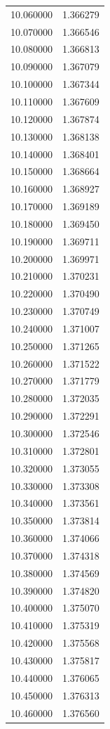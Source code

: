 \begin{tabular}{rr}
10.060000 & 1.366279 \\
10.070000 & 1.366546 \\
10.080000 & 1.366813 \\
10.090000 & 1.367079 \\
10.100000 & 1.367344 \\
10.110000 & 1.367609 \\
10.120000 & 1.367874 \\
10.130000 & 1.368138 \\
10.140000 & 1.368401 \\
10.150000 & 1.368664 \\
10.160000 & 1.368927 \\
10.170000 & 1.369189 \\
10.180000 & 1.369450 \\
10.190000 & 1.369711 \\
10.200000 & 1.369971 \\
10.210000 & 1.370231 \\
10.220000 & 1.370490 \\
10.230000 & 1.370749 \\
10.240000 & 1.371007 \\
10.250000 & 1.371265 \\
10.260000 & 1.371522 \\
10.270000 & 1.371779 \\
10.280000 & 1.372035 \\
10.290000 & 1.372291 \\
10.300000 & 1.372546 \\
10.310000 & 1.372801 \\
10.320000 & 1.373055 \\
10.330000 & 1.373308 \\
10.340000 & 1.373561 \\
10.350000 & 1.373814 \\
10.360000 & 1.374066 \\
10.370000 & 1.374318 \\
10.380000 & 1.374569 \\
10.390000 & 1.374820 \\
10.400000 & 1.375070 \\
10.410000 & 1.375319 \\
10.420000 & 1.375568 \\
10.430000 & 1.375817 \\
10.440000 & 1.376065 \\
10.450000 & 1.376313 \\
10.460000 & 1.376560 \\

\end{tabular}
